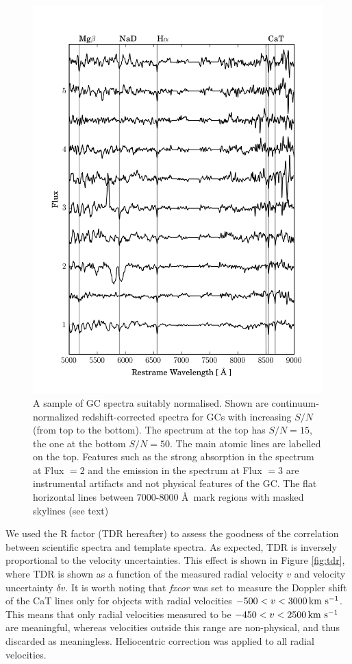 \documentclass[useAMS,usenatbib]{mn2e}
\newcommand{\kms}{\mbox{\,km~s$^{-1}$}}
\begin{document}
\begin{figure}
\centering
\includegraphics[width=\columnwidth]{figures/vstack_spectra.png} 
\caption{A sample of GC spectra suitably normalised. Shown are continuum-normalized redshift-corrected spectra for GCs with increasing $S/N$ (from top to the bottom). The spectrum at the top has $S/N = 15$, the one at the bottom $S/N = 50$. The main atomic lines are labelled on the top. Features such as the strong absorption in the spectrum at Flux $= 2$ and the emission in the spectrum at Flux $=3$ are instrumental artifacts and not physical features of the GC. The flat horizontal lines between 7000-8000 \AA\ mark regions with masked skylines (see text)}
\label{fig:spectra}
\end{figure}

We used the \citet{Tonry79} R factor (TDR hereafter) to assess the goodness of the correlation between scientific spectra and template spectra. As expected, TDR is inversely proportional to the velocity uncertainties. This effect is shown in Figure \ref{fig:tdr}, where TDR is shown as a function of the measured radial velocity $v$ and velocity uncertainty $\delta v$. 
It is worth noting that {\it fxcor} was set to measure the Doppler shift of the CaT lines only for objects with radial velocities $-500 < v < 3000 \kms$. This means that only radial velocities measured to be $-450 < v < 2500 \kms$ are meaningful, whereas velocities outside this range are non-physical, and thus discarded as meaningless. Heliocentric correction was applied to all radial velocities. 
\end{document}
